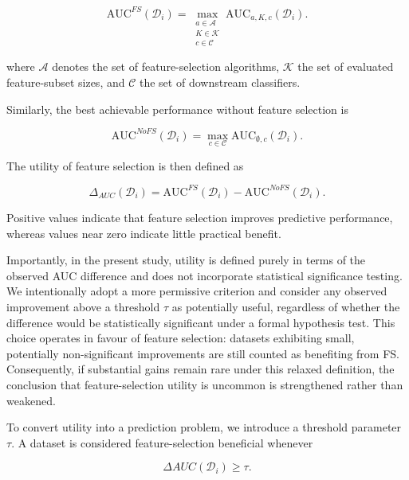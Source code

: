 \documentclass[preprint,12pt,authoryear]{elsarticle}
\begin{document}
\begin{equation}
\mathrm{AUC}^{FS}(\mathcal{D}_i)
=
\max_{\substack{
a \in \mathcal{A} \\
K \in \mathcal{K} \\
c \in \mathcal{C}
}}
\mathrm{AUC}_{a,K,c}(\mathcal{D}_i).
\end{equation}


where $\mathcal{A}$ denotes the set of feature-selection algorithms, $\mathcal{K}$ the set of evaluated feature-subset sizes, and $\mathcal{C}$ the set of downstream classifiers.

Similarly, the best achievable performance without feature selection is

\begin{equation}
\mathrm{AUC}^{NoFS}(\mathcal{D}_i)
=
\max_{c \in \mathcal{C}}
\mathrm{AUC}_{\emptyset,c}(\mathcal{D}_i).
\end{equation}

The utility of feature selection is then defined as

\begin{equation}
\Delta_{AUC}(\mathcal{D}_i)
=
\mathrm{AUC}^{FS}(\mathcal{D}_i)
-
\mathrm{AUC}^{NoFS}(\mathcal{D}_i).
\label{eq:delta_auc}
\end{equation}

Positive values indicate that feature selection improves predictive performance, whereas values near zero indicate little practical benefit.

Importantly, in the present study, utility is defined purely in terms of the observed AUC difference and does not incorporate statistical significance testing. We intentionally adopt a more permissive criterion and consider any observed improvement above a threshold $\tau$ as potentially useful, regardless of whether the difference would be statistically significant under a formal hypothesis test. This choice operates in favour of feature selection: datasets exhibiting small, potentially non-significant improvements are still counted as benefiting from FS. Consequently, if substantial gains remain rare under this relaxed definition, the conclusion that feature-selection utility is uncommon is strengthened rather than weakened.


To convert utility into a prediction problem, we introduce a threshold parameter $\tau$. A dataset is considered feature-selection beneficial whenever

\begin{equation}
\Delta{AUC}(\mathcal{D}_i) \ge \tau.
\label{eq:tau_definition}
\end{equation}
\end{document}
